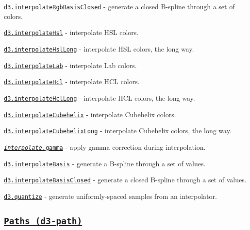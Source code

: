 \begin{DoxyItemize}
\item \href{https://github.com/d3/d3-interpolate/blob/master/README.md#interpolateRgbBasisClosed}{\tt d3.\+interpolate\+Rgb\+Basis\+Closed} -\/ generate a closed B-\/spline through a set of colors.
\item \href{https://github.com/d3/d3-interpolate/blob/master/README.md#interpolateHsl}{\tt d3.\+interpolate\+Hsl} -\/ interpolate H\+SL colors.
\item \href{https://github.com/d3/d3-interpolate/blob/master/README.md#interpolateHslLong}{\tt d3.\+interpolate\+Hsl\+Long} -\/ interpolate H\+SL colors, the long way.
\item \href{https://github.com/d3/d3-interpolate/blob/master/README.md#interpolateLab}{\tt d3.\+interpolate\+Lab} -\/ interpolate Lab colors.
\item \href{https://github.com/d3/d3-interpolate/blob/master/README.md#interpolateHcl}{\tt d3.\+interpolate\+Hcl} -\/ interpolate H\+CL colors.
\item \href{https://github.com/d3/d3-interpolate/blob/master/README.md#interpolateHclLong}{\tt d3.\+interpolate\+Hcl\+Long} -\/ interpolate H\+CL colors, the long way.
\item \href{https://github.com/d3/d3-interpolate/blob/master/README.md#interpolateCubehelix}{\tt d3.\+interpolate\+Cubehelix} -\/ interpolate Cubehelix colors.
\item \href{https://github.com/d3/d3-interpolate/blob/master/README.md#interpolateCubehelixLong}{\tt d3.\+interpolate\+Cubehelix\+Long} -\/ interpolate Cubehelix colors, the long way.
\item \href{https://github.com/d3/d3-interpolate/blob/master/README.md#interpolate_gamma}{\tt {\itshape interpolate}.gamma} -\/ apply gamma correction during interpolation.
\item \href{https://github.com/d3/d3-interpolate/blob/master/README.md#interpolateBasis}{\tt d3.\+interpolate\+Basis} -\/ generate a B-\/spline through a set of values.
\item \href{https://github.com/d3/d3-interpolate/blob/master/README.md#interpolateBasisClosed}{\tt d3.\+interpolate\+Basis\+Closed} -\/ generate a closed B-\/spline through a set of values.
\item \href{https://github.com/d3/d3-interpolate/blob/master/README.md#quantize}{\tt d3.\+quantize} -\/ generate uniformly-\/spaced samples from an interpolator.
\end{DoxyItemize}

\subsection*{\href{https://github.com/d3/d3-path}{\tt Paths (d3-\/path)}}

